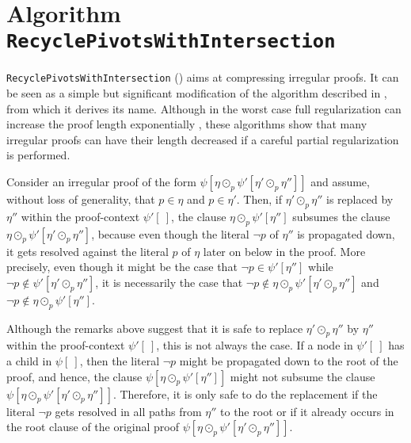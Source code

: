 \section{Algorithm \texttt{RecyclePivotsWithIntersection}}
\label{Section:RPI}

\newcommand{\tRes}{\odot}
\newcommand{\tResFact}{\otimes}
\newcommand{\tResChain}{\ominus}
\newcommand{\AXC}{\AxiomC}
\newcommand{\BIC}{\BinaryInfC}
\newcommand{\RName}[1]{\RightLabel{#1}}
\newcommand{\p}[1]{\hat{#1}}
\newcommand{\ub}[2]{\underbrace{#1}_{#2}}
\newcommand{\tResStar}{\circledast}

\texttt{RecyclePivotsWithIntersection} ({\RPI}) aims at compressing irregular proofs. It can be seen as a simple 
but significant modification of the {\RP} algorithm described in 
\cite{RP08}, 
from which it derives its name. 
Although in the worst case full regularization can increase the proof length exponentially 
\cite{Tseitin}, these algorithms show that 
many irregular proofs can have their length decreased if a careful partial regularization is performed. 

Consider an irregular proof of the form $\psi[ \eta \tRes_p \psi'[\eta' \tRes_p \eta''] ]$ and assume, without loss of generality, that $p \in \eta$ and $p \in \eta'$. Then, if $\eta' \tRes_p \eta''$ is replaced by $\eta''$ within the proof-context $\psi'[\ ]$, the clause $\eta \tRes_p \psi'[\eta'']$ subsumes the clause $\eta \tRes_p \psi'[\eta' \tRes_p \eta'']$, because even though the literal $\neg p$ of $\eta''$ is
propagated down, it gets resolved against the literal $p$ of $\eta$ later on below in the proof. More precisely, even though it might be the case that $\neg p \in \psi'[\eta'']$ while $\neg p \notin \psi'[\eta' \tRes_p \eta'']$, it is necessarily the case that $\neg p \notin \eta \tRes_p \psi'[\eta' \tRes_p \eta'']$ and $\neg p \notin \eta \tRes_p \psi'[\eta'']$.

Although the remarks above suggest that it is safe to replace $\eta' \tRes_p
\eta''$ by $\eta''$ within the proof-context $\psi'[\ ]$, this is not always the
case. If a node in $\psi'[\ ]$ has a child in $\psi[\ ]$, then the literal $\neg
p$ might be propagated down to the root of the proof, and hence, the clause
$\psi[ \eta \tRes_p \psi'[ \eta''] ]$ might not subsume the clause $\psi[ \eta
\tRes_p \psi'[\eta' \tRes_p \eta''] ]$. Therefore, it is only safe to do the
replacement if the literal $\neg p$ gets resolved in all paths from $\eta''$ to the root or if it already occurs in the root clause of the original proof $\psi[ \eta \tRes_p \psi'[\eta' \tRes_p \eta''] ]$.


